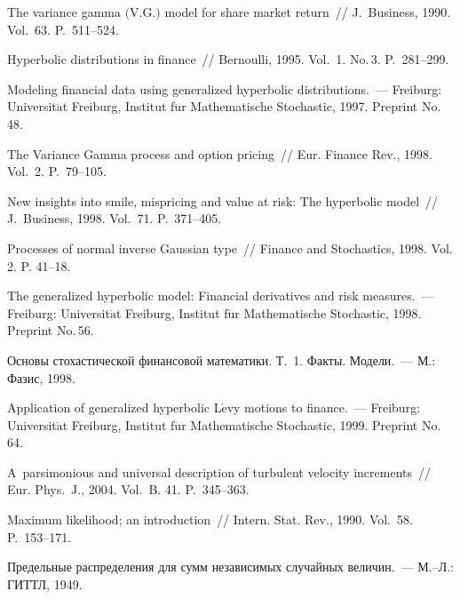 \begin{multicols}{2}
{{\begin{thebibliography}{99}
 The variance gamma $($V.G.$)$ model for
share market return~// J.~Business, 1990. Vol.~63. P.~511--524.

 Hyperbolic distributions in finance~//
Bernoulli, 1995. Vol.~1. No.\,3. P.~281--299.

 Modeling financial data using generalized hyperbolic
distri\-butions.~--- Freiburg: Universit$\ddot{\mbox{a}}$t Freiburg, Institut
f$\ddot{\mbox{u}}$r Mathematische Stochastic, 1997. Preprint No.\,48.

 The Variance Gamma
process and option pricing~// Eur. Finance Rev., 1998. Vol.~2. P.~79--105.

 New insights into smile,
mispricing and value at risk: The hyperbolic model~// J.~Business, 1998. Vol.~71. P.~371--405.

 Processes of normal inverse Gaussian
type~// Finance and Stochastics, 1998. Vol. 2. P. 41--18.

 The generalized hyperbolic model:
Financial derivatives and risk measures.~--- Freiburg:
Universit$\ddot{\mbox{a}}$t Freiburg, Institut f$\ddot{\mbox{u}}$r Mathematische Stochastic,
1998. Preprint No.\,56.

 Основы стохастической финансовой математики. Т.~1. 
Факты. Модели.~--- М.: Фазис, 1998.

 Application of generalized hyperbolic L$\acute{\mbox{e}}$vy
motions to finance.~--- Freiburg: Universit$\ddot{\mbox{a}}$t Freiburg, Institut
f$\ddot{\mbox{u}}$r Mathematische Stochastic, 1999. Preprint No.\,64.

A~parsimonious and universal description of turbulent velocity
increments~// Eur. Phys.~J., 2004. Vol.~B. 41.
P.~345--363.

 Maximum likelihood; an introduction~// Intern.
Stat. Rev., 1990. Vol.~58. P.~153--171.

 Предельные распределения для
сумм независимых случайных величин.~--- М.--Л.: ГИТТЛ, 1949.


\end{thebibliography}}}
\end{multicols}
